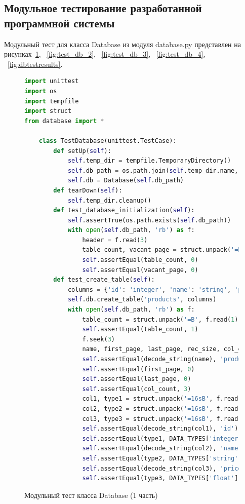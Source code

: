 \subsection{Модульное тестирование разработанной программной системы}

Модульный тест для класса Database из модуля database.py представлен на рисунках~\ref{fig:test_db_1}, ~\ref{fig:test_db_2}, ~\ref{fig:test_db_3}, ~\ref{fig:test_db_4}, ~\ref{fig:dbtestresults}.

\begin{figure}[H]
\begin{lstlisting}[language=Python, breaklines=true]
import unittest
import os
import tempfile
import struct
from database import *

	class TestDatabase(unittest.TestCase):
		def setUp(self):
			self.temp_dir = tempfile.TemporaryDirectory()
			self.db_path = os.path.join(self.temp_dir.name, 'test.db')
			self.db = Database(self.db_path)		
		def tearDown(self):
			self.temp_dir.cleanup()				
		def test_database_initialization(self):
			self.assertTrue(os.path.exists(self.db_path))
			with open(self.db_path, 'rb') as f:
				header = f.read(3)
				table_count, vacant_page = struct.unpack('=BH', header)
				self.assertEqual(table_count, 0)
				self.assertEqual(vacant_page, 0)		
		def test_create_table(self):
			columns = {'id': 'integer', 'name': 'string', 'price': 'float'}
			self.db.create_table('products', columns)
			with open(self.db_path, 'rb') as f:
				table_count = struct.unpack('=B', f.read(1))[0]
				self.assertEqual(table_count, 1)				
				f.seek(3)				
				name, first_page, last_page, rec_size, col_count = struct.unpack('=16sHHHB', f.read(23))
				self.assertEqual(decode_string(name), 'products')
				self.assertEqual(first_page, 0)
				self.assertEqual(last_page, 0)
				self.assertEqual(col_count, 3)				
				col1, type1 = struct.unpack('=16sB', f.read(17))
				col2, type2 = struct.unpack('=16sB', f.read(17))
				col3, type3 = struct.unpack('=16sB', f.read(17))				
				self.assertEqual(decode_string(col1), 'id')
				self.assertEqual(type1, DATA_TYPES['integer'])
				self.assertEqual(decode_string(col2), 'name')
				self.assertEqual(type2, DATA_TYPES['string'])
				self.assertEqual(decode_string(col3), 'price')
				self.assertEqual(type3, DATA_TYPES['float'])
\end{lstlisting}  
\caption{Модульный тест класса Database (1 часть)}
\label{fig:test_db_1}
\end{figure}
	
